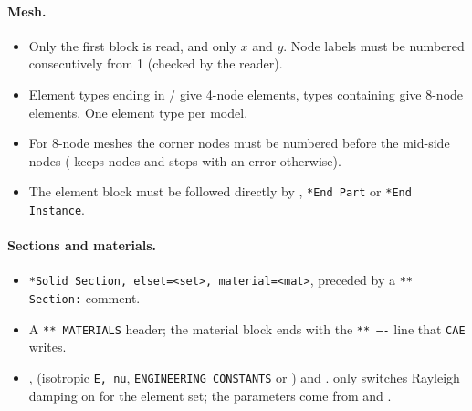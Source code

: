 \paragraph{Mesh.}
\begin{itemize}
  \item Only the first  block is read, and only $x$ and $y$. Node
    labels must be numbered consecutively from 1 (checked by the reader).
  \item Element types ending in / give 4-node elements, types
    containing  give 8-node elements. One element type per model.
  \item For 8-node meshes the corner nodes must be numbered before the mid-side
    nodes ( keeps nodes  and
    stops with an error otherwise).
  \item The element block must be followed directly by ,
    \texttt{*End Part} or \texttt{*End Instance}.
\end{itemize}

\paragraph{Sections and materials.}
\begin{itemize}
  \item \texttt{*Solid Section, elset=<set>, material=<mat>}, preceded by a
    \texttt{** Section:} comment.
  \item A \texttt{** MATERIALS} header; the material block ends with the
    \texttt{** ----} line that \texttt{CAE} writes.
  \item {},  (isotropic \texttt{E, nu},
    \texttt{ENGINEERING CONSTANTS} or ) and .
     only switches Rayleigh damping on for the element set; the
    parameters come from  and .
\end{itemize}

